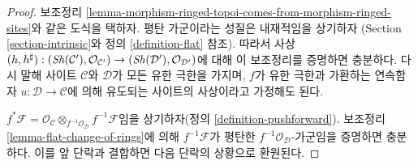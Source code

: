 \begin{proof}
보조정리 \ref{lemma-morphism-ringed-topoi-comes-from-morphism-ringed-sites}와
같은 도식을 택하자. 평탄 가군이라는 성질은 내재적임을 상기하자
(Section \ref{section-intrinsic}와
정의 \ref{definition-flat} 참조).
따라서 사상 $(h, h^\sharp) :
(\mathop{\mathit{Sh}}\nolimits(\mathcal{C}'), \mathcal{O}_{\mathcal{C}'})
\to
(\mathop{\mathit{Sh}}\nolimits(\mathcal{D}'), \mathcal{O}_{\mathcal{D}'})$에 대해 이 보조정리를
증명하면 충분하다. 다시 말해 사이트 $\mathcal{C}$와 $\mathcal{D}$가
모든 유한 극한을 가지며, $f$가 유한 극한과 가환하는 연속함자
$u : \mathcal{D} \to \mathcal{C}$에 의해 유도되는 사이트의 사상이라고
가정해도 된다.

\medskip\noindent
$f^*\mathcal{F} =
\mathcal{O}_\mathcal{C} \otimes_{f^{-1}\mathcal{O}_\mathcal{D}}
f^{-1}\mathcal{F}$임을 상기하자(정의 \ref{definition-pushforward}).
보조정리 \ref{lemma-flat-change-of-rings}에 의해
$f^{-1}\mathcal{F}$가 평탄한 $f^{-1}\mathcal{O}_\mathcal{D}$-가군임을
증명하면 충분하다. 이를 앞 단락과 결합하면 다음 단락의 상황으로 환원된다.


\end{proof}
